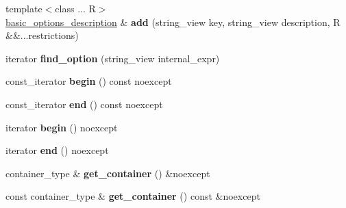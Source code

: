\begin{DoxyCompactItemize}
\item 
\mbox{\label{classouchi_1_1program__options_1_1basic__options__description_a1f97fb20c529e04046629e0dc3781cd0}} 
{\footnotesize template$<$class ... R$>$ }\\\mbox{\hyperlink{classouchi_1_1program__options_1_1basic__options__description}{basic\+\_\+options\+\_\+description}} \& {\bfseries add} (string\+\_\+view key, string\+\_\+view description, R \&\&...restrictions)
\item 
\mbox{\label{classouchi_1_1program__options_1_1basic__options__description_acd65462bf2a5596d04d2c6ef0221df83}} 
iterator {\bfseries find\+\_\+option} (string\+\_\+view internal\+\_\+expr)
\item 
\mbox{\label{classouchi_1_1program__options_1_1basic__options__description_ad7ce93c0b80b70adbbed6b493031d049}} 
const\+\_\+iterator {\bfseries begin} () const noexcept
\item 
\mbox{\label{classouchi_1_1program__options_1_1basic__options__description_a79397a4065b3d8b96af4c8a844884dfe}} 
const\+\_\+iterator {\bfseries end} () const noexcept
\item 
\mbox{\label{classouchi_1_1program__options_1_1basic__options__description_add8af51ffe45301c117386e4579a9d0a}} 
iterator {\bfseries begin} () noexcept
\item 
\mbox{\label{classouchi_1_1program__options_1_1basic__options__description_a19c1549e6bc6a77f004b7d5d2d8a2a7a}} 
iterator {\bfseries end} () noexcept
\item 
\mbox{\label{classouchi_1_1program__options_1_1basic__options__description_a774ade9607c30131183a8818be9c00e5}} 
container\+\_\+type \& {\bfseries get\+\_\+container} () \&noexcept
\item 
\mbox{\label{classouchi_1_1program__options_1_1basic__options__description_a29184b4ad00f893e086ead23f7f591e8}} 
const container\+\_\+type \& {\bfseries get\+\_\+container} () const \&noexcept
\end{DoxyCompactItemize}
